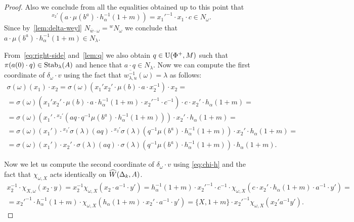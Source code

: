 \begin{proof}
 Also we conclude from all the equalities obtained up to this point that
 \begin{equation} {}^{x_2'}(a \cdot \mu(b^a) \cdot h_\alpha^{-1}(1+m)) = {x_1'}^{-1} \cdot x_1 \cdot c \in N_\omega. \end{equation}
 Since by~\cref{lem:delta-weyl} $N_{\overline{w} \cdot \omega} = {}^w{N_\omega}$ we conclude that
  $a \cdot \mu(b^a) \cdot h_\alpha^{-1}(1+m) \in {N_{\lambda}}$.

 From~\eqref{eq:right-side} and~\cref{lem:q} we also obtain $q \in \operatorname{U}(\Phi^+, M)$ such that $\pi(a(0) \cdot q) \in \operatorname{Stab}_\lambda(A)$ and hence
     that $a \cdot q \in N_\lambda$.
 Now we can compute the first coordinate of $\delta_\omega \cdot v$ using the fact that $\overline{w_{\lambda, u}^{-1}}(\omega) = \lambda$ as follows:
 \begin{multline*}
  \sigma(\omega)(x_1) \cdot x_2 = \sigma(\omega)(x_1'x_2' \cdot \mu(b) \cdot a \cdot x_2^{-1}) \cdot x_2 = \\
   = \sigma(\omega)(x_1'x_2' \cdot \mu(b) \cdot a \cdot h^{-1}_\alpha(1+m) \cdot {x_2'}^{-1} \cdot c^{-1}) \cdot c \cdot x_2' \cdot h_{\alpha}(1+m) = \\
   = \sigma(\omega)\left(x_1'\cdot {}^{x_2'} (aq \cdot q^{-1} \mu(b^a) \cdot h^{-1}_\alpha(1+m))\right) \cdot x_2' \cdot h_{\alpha}(1+m) = \\
   = \sigma(\omega)(x_1') \cdot {}^{x_2'}\sigma(\lambda)(aq) \cdot {}^{x_2'}\sigma(\lambda)(q^{-1} \mu(b^a) \cdot h^{-1}_\alpha(1+m)) \cdot x_2' \cdot h_{\alpha}(1+m) = \\
   = \sigma(\omega)(x_1') \cdot x_2' \cdot \sigma(\lambda)(aq) \cdot \sigma(\lambda)(q^{-1} \mu(b^a) \cdot h^{-1}_\alpha(1+m)) \cdot h_{\alpha}(1+m).
 \end{multline*}

 Now we let us compute the second coordinate of $\delta_\omega \cdot v$ using \eqref{eq:chi-h} and the fact that
 $\chi_{\omega, X}$ acts identically on $\widehat{W}(\Delta_k, A)$.
 \begin{multline*}
 x_2^{-1}\cdot \chi_{X, \omega}(x_2 \cdot y) = x_2^{-1}\chi_{\omega, X}(x_2 \cdot a^{-1} \cdot y') =
 h_{\alpha}^{-1}(1 + m) \cdot {x_2'}^{-1} \cdot c^{-1} \cdot \chi_{\omega, X}(c \cdot x_2' \cdot h_{\alpha}(1 + m) \cdot a^{-1} \cdot y') = \\
 = {x_2'}^{-1} \cdot h_{\alpha}^{-1}(1 + m) \cdot \chi_{\omega, X}(h_{\alpha}(1 + m) \cdot x_2' \cdot a^{-1} \cdot y') = \{X, 1+m\} \cdot {x_2'}^{-1} \chi_{\omega, X}(x_2' a^{-1} y').
 \end{multline*}


 \end{proof}


